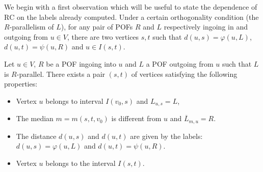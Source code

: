 \documentclass[a4paper,UKenglish,numberwithinsect,cleveref, autoref,anonymous]{lipics-v2021}
\newcommand{\rc}{\mbox{RC}}
\begin{document}
We begin with a first observation which will be useful to state the dependence of $\rc$ on the labels already computed. Under a certain orthogonality condition (the $R$-parallelism of $L$), for any pair of POFs $R$ and $L$ respectively ingoing in and outgoing from $u \in V$, there are two vertices $s,t$ such that $d(u,s) = \varphi(u,L)$, $d(u,t) = \psi(u,R)$ and $u \in I(s,t)$.

\begin{theorem}
Let $u \in V$, $R$ be a POF ingoing into $u$ and $L$ a POF outgoing from $u$ such that $L$ is $R$-parallel. There exists a pair $(s,t)$ of vertices satisfying the following properties:
\begin{itemize}
    \item Vertex $u$ belongs to interval $I(v_0,s)$ and $L_{u,s} = L$,
    \item The median $m = m(s,t,v_0)$ is different from $u$ and $\overline{L}_{m,u} = R$.
    \item The distance $d(u,s)$ and $d(u,t)$ are given by the labels: $d(u,s) = \varphi(u,L)$ and $d(u,t) = \psi(u,R)$.
    \item Vertex $u$ belongs to the interval $I(s,t)$.
\end{itemize}
\label{th:psi_plus_phi}
\end{theorem}
\end{document}
